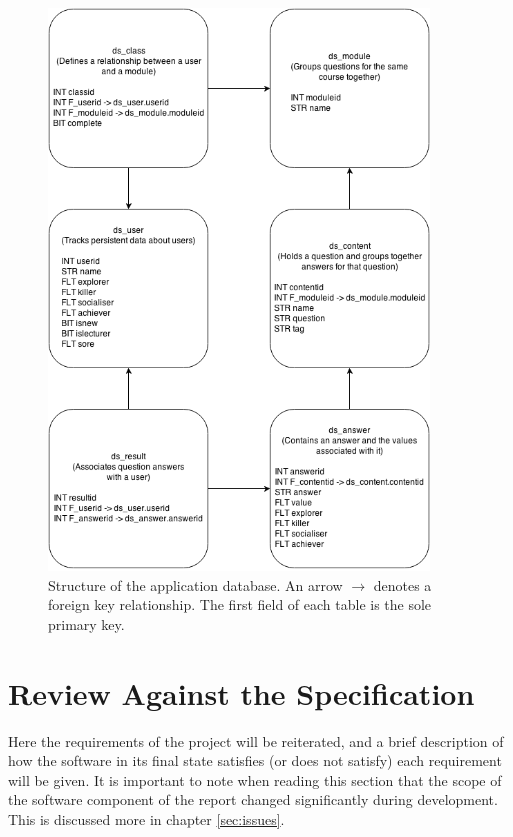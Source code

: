 \documentclass[12pt,a4paper,twoside]{report}
\begin{document}
\begin{figure}
	\begin{center}
		\includegraphics[width=0.9\textwidth]{../img/database.png}
		\caption{Structure of the application database. An arrow $\rightarrow$ denotes a foreign key relationship. The first field of each table is the sole primary key.}
		\label{database}
	\end{center}
\end{figure}

\section{Review Against the Specification}
Here the requirements of the project will be reiterated, and a brief description of how the software in its final state satisfies (or does not satisfy) each requirement will be given. It is important to note when reading this section that the scope of the software component of the report changed significantly during development. This is discussed more in chapter \ref{sec:issues}.
\end{document}
